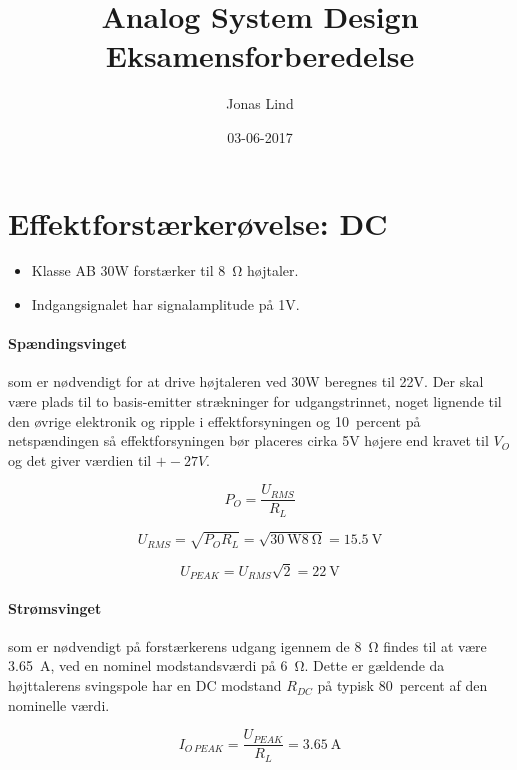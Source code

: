 \documentclass[danish]{article}
\begin{document}
\title{\textbf{ Analog System Design }   Eksamensforberedelse}
\author{Jonas Lind}
\date{03-06-2017}
\maketitle
\section{Effektforstærkerøvelse: DC}
\begin{itemize}
	\item Klasse AB 30W forstærker til \SI{8}{\ohm} højtaler.
	\item Indgangsignalet har signalamplitude på 1V.
\end{itemize}

\paragraph{Spændingsvinget} som er nødvendigt for at drive højtaleren ved 30W beregnes til 22V. Der skal være plads til to basis-emitter strækninger for udgangstrinnet, noget lignende til den øvrige elektronik og ripple i effektforsyningen og  \SI{10}{percent}  på netspændingen så effektforsyningen bør placeres cirka 5V højere end kravet til $V_O$ og det giver værdien til $+-27V$.

\begin{equation}
P_O = \dfrac{U_{RMS}}{R_L}
\end{equation}

\begin{equation}
U_{RMS} = \sqrt{P_O R_L} = \sqrt{\SI{30}{\watt} \SI{8}{\ohm}} = \SI{15.5}{\volt}
\end{equation}

\begin{equation}
U_{PEAK} = U_{RMS} \sqrt{2} = \SI{22}{\volt}
\end{equation}
\paragraph{Strømsvinget} som er nødvendigt på forstærkerens udgang igennem de \SI{8}{\ohm} findes til at være \SI{3.65}{\ampere}, ved en nominel modstandsværdi på \SI{6}{\ohm}. Dette er gældende da højttalerens svingspole har en DC modstand $R_{DC}$ på typisk \SI{80}{percent}  af den nominelle værdi.

\begin{equation}
I_{O\,PEAK} = \dfrac{U_{PEAK}}{R_L} = \SI{3.65}{\ampere}
\end{equation}
\end{document}
